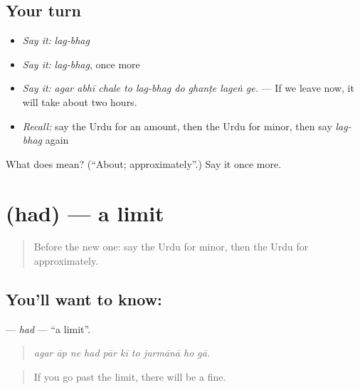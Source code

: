 \subsection*{Your turn}
\begin{itemize}
\raggedright
  \item \emph{Say it:} \emph{lag-bhag}
  \item \emph{Say it:} \emph{lag-bhag}, once more
  \item \emph{Say it:} \emph{agar abhī chale to lag-bhag do ghanṭe lageṅ ge.} — If we leave now, it will take about two hours.
  \item \emph{Recall:} say the Urdu for an amount, then the Urdu for minor, then say \emph{lag-bhag} again
\end{itemize}

\begin{tcolorbox}[breakable,colback=teal!4,colframe=teal!35!black,title={Before you move on}]
What does   mean? (\textquotedblleft{}About; approximately\textquotedblright{}.) Say it once more.
\end{tcolorbox}
\section[\texorpdfstring{\ur{حد} (had)}{حد (had)}]{ (had) — a limit}

\label{lesson:UR-C376-had}



\begin{quote}
Before the new one: say the Urdu for minor, then the Urdu for approximately.
\end{quote}

\subsection*{You'll want to know: }
\textbf{} — \emph{had} — \textquotedblleft{}a limit\textquotedblright{}.

\begin{quote}
         
\end{quote}

\begin{quote}
\emph{agar āp ne had pār kī to jurmānā ho gā.}
\end{quote}

\begin{quote}
If you go past the limit, there will be a fine.
\end{quote}

